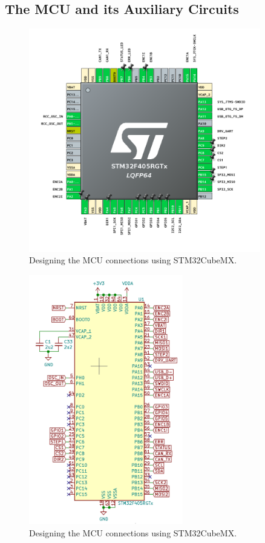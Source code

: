 \subsection{The MCU and its Auxiliary Circuits}
\label{subsec:mcu_design}

\begin{figure}[H]
    \centering
    \includegraphics[width=0.9\textwidth]{obrazky/cube_mx}
    \caption{Designing the MCU connections using STM32CubeMX.}
    \label{fig:cubemx}
\end{figure}

\begin{figure}[H]
    \centering
    \includegraphics[width=0.6\textwidth]{obrazky/schem_mcu}
    \caption{Designing the MCU connections using STM32CubeMX.}
    \label{fig:schem_mcu}
\end{figure}

